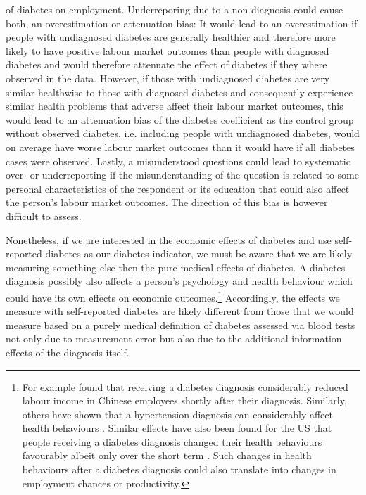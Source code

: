 of diabetes on employment. Underreporing due to a non-diagnosis could cause both, an overestimation or attenuation bias: It would lead to an overestimation if people with undiagnosed diabetes are generally healthier and therefore more likely to have positive labour market outcomes than people with diagnosed diabetes and would therefore attenuate the effect of diabetes if they where observed in the data. However, if those with undiagnosed diabetes are very similar healthwise to those with diagnosed diabetes and consequently experience similar health problems that adverse affect their labour market outcomes, this would lead to an attenuation bias of the diabetes coefficient as the control group without observed diabetes, i.e. including people with undiagnosed diabetes, would on average have worse labour market outcomes than it would have if all diabetes cases were observed. Lastly, a misunderstood questions could lead to systematic over- or underreporting if the misunderstanding of the question is related to some personal characteristics of the respondent or its education that could also affect the person's labour market outcomes. The direction of this bias is however difficult to assess.

Nonetheless, if we are interested in the economic effects of diabetes
and use self-reported diabetes as our diabetes indicator, we must
be aware that we are likely measuring something else then the pure
medical effects of diabetes. A diabetes diagnosis possibly also affects
a person's psychology and health behaviour which could have its own
effects on economic outcomes.\footnote{For example \citet{Liu2014} found that receiving a diabetes diagnosis
considerably reduced labour income in Chinese employees shortly after
their diagnosis. Similarly, others have shown that a hypertension
diagnosis can considerably affect health behaviours \citep{Zhao2013a}.
Similar effects have also been found for the US that people receiving
a diabetes diagnosis changed their health behaviours favourably albeit
only over the short term \citep{Slade2012}. Such changes in health
behaviours after a diabetes diagnosis could also translate into changes
in employment chances or productivity.} Accordingly, the effects we measure with self-reported diabetes are
likely different from those that we would measure based on a purely
medical definition of diabetes assessed via blood tests not only due to measurement error but also due to the additional information effects of the diagnosis itself.


  
  
  
  
  